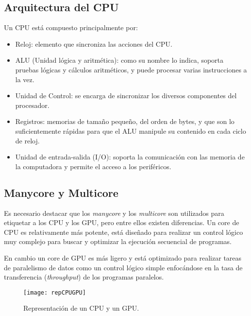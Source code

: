      \subsection{Arquitectura del CPU}

Un \acrshort{CPU} está compuesto principalmente por:
\begin{itemize}
\item Reloj: elemento que sincroniza las acciones del CPU.
\item ALU (Unidad lógica y aritmética): como su nombre lo indica, soporta pruebas lógicas y cálculos aritméticos, y puede procesar varias instrucciones a la vez.
\item Unidad de Control: se encarga de sincronizar los diversos componentes del procesador.
\item Registros: memorias de tamaño pequeño, del orden de bytes, y que son lo suficientemente rápidas para que el ALU manipule su contenido en cada ciclo de reloj.
\item Unidad de entrada-salida (I/O): soporta la comunicación con las memoria de la computadora y permite el acceso a los periféricos.
\end{itemize}   

\subsection{Manycore y Multicore}
    Es necesario destacar que los \textit{manycore} y los \textit{multicore} son utilizados para etiquetar a los \acrshort{CPU} y los \acrshort{GPU}, pero entre ellos existen diferencias. Un core de \acrshort{CPU} es relativamente más potente, está diseñado para realizar un control lógico muy complejo para buscar y optimizar la ejecución secuencial de programas.
   
    \vspace{0.3cm}
    
    En cambio un core de \acrshort{GPU} es más ligero y está optimizado para realizar tareas de paralelismo de datos como un control lógico simple enfocándose en la tasa de transferencia (\textit{\gls{throughput}}) de los programas paralelos.
    
        \begin{figure}[ht]
      \centering
        \texttt{[image: repCPUGPU]}
        \caption{Representación de un \acrshort{CPU} y un \acrshort{GPU}\cite{NCUDA}.}
        \label{fig:gpgpu}
    \end{figure}
    
